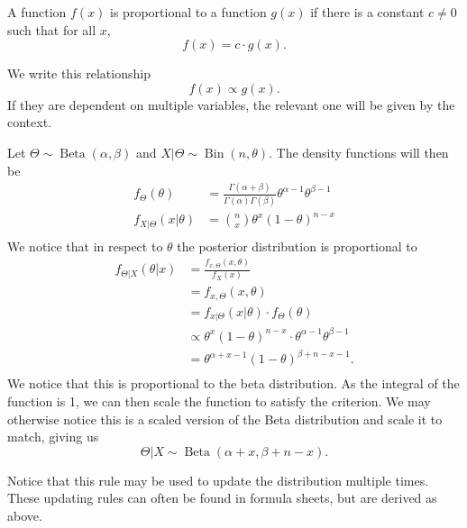 \begin{definition}[Proportionality]
	A function \(f(x)\) is proportional to a function \(g(x)\) if there is a constant \(c \ne 0\) such that for all \(x\), 
	\[
		f(x) = c  \cdot g(x).
	\]

	We write this relationship
	\[
		f(x) \propto g(x).
	\]
	If they are dependent on multiple variables, the relevant one will be given by the context.
\end{definition}


\begin{example}
	Let \(\Theta \sim \operatorname{Beta} (\alpha , \beta )\) and \(X|\Theta \sim \operatorname{Bin}(n, \theta)\). The density functions will then be
	\begin{align*}
		f_ \Theta (\theta ) &= \frac{\Gamma(\alpha + \beta) }{\Gamma(\alpha )\Gamma(\beta )} \theta ^{\alpha -1} \theta ^{\beta -1} \\
		f _{X | \Theta }(x | \theta ) &= \binom{n}{x} \theta ^x (1-\theta ) ^{n-x} \\
	\end{align*}
	We notice that in respect to \(\theta \) the posterior distribution is proportional to
	\begin{align*}
		f _{\Theta |X}(\theta | x) 
			&= \frac{ f _{x, \Theta }(x, \theta) }{f _X (x)} \\
			&= f _{x, \Theta }(x, \theta) \\
			&= f _{x| \Theta }(x| \theta)  \cdot f _{\Theta } (\theta )\\
			&\propto \theta ^x (1-\theta ) ^{n-x}  \cdot \theta ^{\alpha -1} \theta ^{\beta -1} \\
			&= \theta ^{\alpha + x - 1} (1 - \theta ) ^{\beta + n - x - 1}. \\
	\end{align*}
	We notice that this is proportional to the beta distribution. As the integral of the function is 1, we can then scale the function to satisfy the criterion. We may otherwise notice this is a scaled version of the Beta distribution and scale it to match, giving us
	\[
		\Theta |X \sim \operatorname{Beta} (\alpha +x, \beta + n -x).
	\]
\end{example}


\begin{obs}
	Notice that this rule may be used to update the distribution multiple times. These updating rules can often be found in formula sheets, but are derived as above.
\end{obs}

